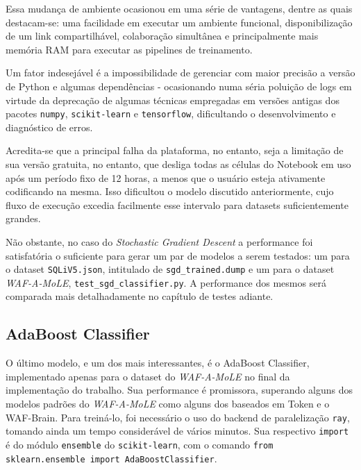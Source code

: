 Essa mudança de ambiente ocasionou em uma série de vantagens, dentre as quais destacam-se: uma facilidade em executar um ambiente funcional, disponibilização de um link compartilhável, colaboração simultânea e principalmente mais memória RAM para executar as pipelines de treinamento. 

Um fator indesejável é a impossibilidade de gerenciar com maior precisão a versão de Python e algumas dependências - ocasionando numa séria poluição de logs em virtude da deprecação de algumas técnicas empregadas em versões antigas dos pacotes \verb+numpy+, \verb+scikit-learn+ e \verb+tensorflow+, dificultando o desenvolvimento e diagnóstico de erros. 

Acredita-se que a principal falha da plataforma, no entanto, seja a limitação de sua versão gratuita, no entanto, que desliga todas as células do Notebook em uso após um período fixo de 12 horas, a menos que o usuário esteja ativamente codificando na mesma. Isso dificultou o modelo discutido anteriormente, cujo fluxo de execução excedia facilmente esse intervalo para datasets suficientemente grandes.

Não obstante, no caso do \textit{Stochastic Gradient Descent} a performance foi satisfatória o suficiente para gerar um par de modelos a serem testados: um para o dataset \verb+SQLiV5.json+, intitulado de \verb+sgd_trained.dump+ e um para o dataset \textit{WAF-A-MoLE}, \verb+test_sgd_classifier.py+. A performance dos mesmos será comparada mais detalhadamente no capítulo de testes adiante. 

\label{sec:codigos:modelos}
\bigskip

\subsection{AdaBoost Classifier}

O último modelo, e um dos mais interessantes, é o AdaBoost Classifier, implementado apenas para o dataset do \textit{WAF-A-MoLE} no final da implementação do trabalho. Sua performance é promissora, superando alguns dos modelos padrões do \textit{WAF-A-MoLE} como alguns dos baseados em Token e o WAF-Brain. Para treiná-lo, foi necessário o uso do backend de paralelização \verb+ray+, tomando ainda um tempo considerável de vários minutos. Sua respectivo \verb+import+ é do módulo \verb+ensemble+ do \verb+scikit-learn+, com o comando \verb+from sklearn.ensemble import AdaBoostClassifier+. 


